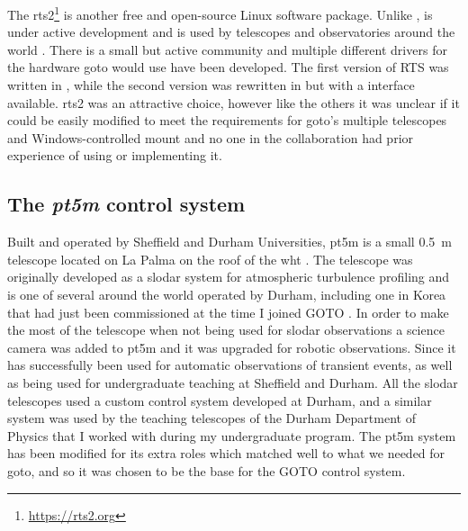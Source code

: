 \begin{colsection}
\begin{colsection}
The \gls{rts2}\footnote{\url{https://rts2.org}} \citep{RTS2, RTS2b} is another free and open-source Linux software package. Unlike ,  is under active development and is used by telescopes and observatories around the world \citep{BORAT, BOOTES-3, antarctic, ARTN}. There is a small but active community and multiple different drivers for the hardware \gls{goto} would use have been developed. The first version of RTS was written in , while the second version was rewritten in  but with a  interface available. \gls{rts2} was an attractive choice, however like the others it was unclear if it could be easily modified to meet the requirements for \gls{goto}'s multiple telescopes and Windows-controlled mount and no one in the collaboration had prior experience of using or implementing it.

\end{colsection}


\subsection{The \textit{pt5m} control system}
\label{sec:pt5m}
\begin{colsection}

Built and operated by Sheffield and Durham Universities, \gls{pt5m} is a small \SI{0.5}{\metre} telescope located on La Palma on the roof of the \gls{wht} \citep{pt5m}. The telescope was originally developed as a \gls{slodar} system for atmospheric turbulence profiling \citep{SLODAR_LaPalma} and is one of several around the world operated by Durham, including one in Korea that had just been commissioned at the time I joined GOTO \citep{SLODAR_Korea}. In order to make the most of the telescope when not being used for \gls{slodar} observations a science camera was added to \gls{pt5m} and it was upgraded for robotic observations. Since it has successfully been used for automatic observations of transient events, as well as being used for undergraduate teaching at Sheffield and Durham. All the \gls{slodar} telescopes used a custom control system developed at Durham, and a similar system was used by the teaching telescopes of the Durham Department of Physics that I worked with during my undergraduate program. The \gls{pt5m} system has been modified for its extra roles which matched well to what we needed for \gls{goto}, and so it was chosen to be the base for the GOTO control system.


\end{colsection}
\end{colsection}
